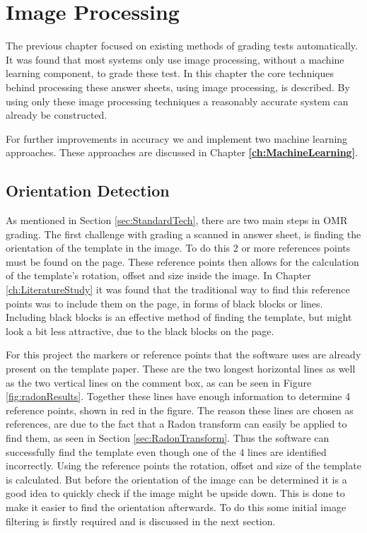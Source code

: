 \chapter{Image Processing}
\label{ch:ImageProcessing}
\graphicspath{{Chapter3/Chapter3Figures/}}
The previous chapter focused on existing methods of grading tests automatically. It was found that most systems only use image processing, without a machine learning component, to grade these test. In this chapter the core techniques behind processing these answer sheets, using image processing, is described. By using only these image processing techniques a reasonably accurate system can already be constructed.

For further improvements in accuracy we and implement two machine learning approaches. These approaches are discussed in Chapter \textbf{\ref{ch:MachineLearning}}.

\section{Orientation Detection}
\label{sec:orientDetect}
As mentioned in Section \ref{sec:StandardTech}, there are two main steps in OMR grading. The first challenge with grading a scanned in answer sheet, is finding the orientation of the template in the image. To do this 2 or more references points must be found on the page. These reference points then allows for the calculation of the template's rotation, offset and size inside the image. In Chapter \ref{ch:LiteratureStudy} it was found that the traditional way to find this reference points was to include them on the page, in forms of black blocks or lines. Including black blocks is an effective method of finding the template, but might look a bit less attractive, due to the black blocks on the page.

For this project the markers or reference points that the software uses are already present on the template paper. These are the two longest horizontal lines as well as the two vertical lines on the comment box, as can be seen in Figure \ref{fig:radonResults}. Together these lines have enough information to determine 4 reference points, shown in red in the figure. The reason these lines are chosen as references, are due to the fact that a Radon transform can easily be applied to find them, as seen in Section \ref{sec:RadonTransform}. Thus the software can successfully find the template even though one of the 4 lines are identified incorrectly. Using the reference points the rotation, offset and size of the template is calculated. But before the orientation of the image can be determined it is a good idea to quickly check if the image might be upside down. This is done to make it easier to find the orientation afterwards. To do this some initial image filtering is firstly required and is discussed in the next section.

